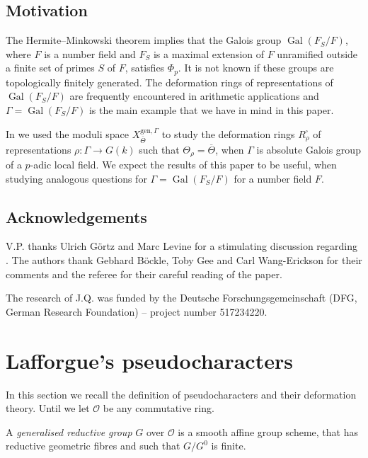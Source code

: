 \documentclass{amsart}
\theoremstyle{definition}
\theoremstyle{remark}
\DeclareMathOperator{\Gal}{Gal}
\newcommand{\OO}{\mathcal O}
\newcommand{\gen}{\mathrm{gen}}
\newcommand{\Thetabar}{\overline{\Theta}}
\begin{document}
\subsection{Motivation}  The Hermite--Minkowski theorem implies that the Galois group $\Gal(F_S/F)$, where
$F$ is a number field and $F_S$ is a maximal extension of $F$ unramified 
outside a finite set of primes $S$ of $F$, satisfies $\Phi_p$.
It is not known if these groups are topologically finitely generated. 
The deformation rings of representations of $\Gal(F_S/F)$ are frequently encountered in arithmetic applications and $\Gamma=\Gal(F_S/F)$ is the main example that we have in mind in this paper.

In \cite{defG} we used the moduli space $X^{\gen, \Gamma}_{\Thetabar}$ to study 
the deformation rings $R^{\square}_{\rho}$ of representations $\rho: \Gamma \rightarrow G(k)$ such that 
$\Theta_{\rho}=\Thetabar$, when $\Gamma$ is absolute Galois group of a 
$p$-adic local field.  We expect the results of this paper to be useful, when
studying analogous questions for $\Gamma=\Gal(F_S/F)$ for a number field $F$. 
\subsection{Acknowledgements} V.P. thanks Ulrich G\"ortz and Marc Levine
for a stimulating discussion regarding . The authors thank Gebhard B\"ockle, Toby Gee and Carl Wang-Erickson for their comments and the referee for their careful reading of the paper. 

The research of J.Q. was funded by the Deutsche Forschungsgemeinschaft (DFG, German Research Foundation) – project number 517234220.


 \section{Lafforgue's pseudocharacters}\label{laf}

In this section we recall the definition of pseudocharacters and their deformation theory.  Until   we let $\OO$ be any commutative ring.



A \emph{generalised reductive group} $G$ over $\OO$ is a 
smooth affine group scheme, that has reductive geometric fibres and such that $G/G^0$ is finite.
\end{document}
